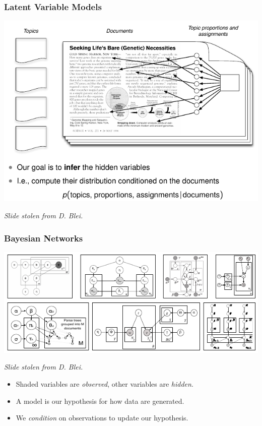 \documentclass{beamer}
\begin{document}
\begin{frame}
  \frametitle{Latent Variable Models}
  {\centering \includegraphics[width=\textwidth]{assets/lda_hidden.pdf}}
  {\small \emph{Slide stolen from D. Blei.} \par}
\end{frame}

\begin{frame}
  \frametitle{Bayesian Networks}
  {\centering \includegraphics[width=\textwidth]{assets/lda_crazy.pdf}}
  {\small \emph{Slide stolen from D. Blei.} \par}
  \begin{itemize}
  \item Shaded variables are \emph{observed}, other variables are \emph{hidden}.
  \item A model is our hypothesis for how data are generated.
  \item We \emph{condition} on observations to update our hypothesis.
  \end{itemize}
\end{frame}
\end{document}
